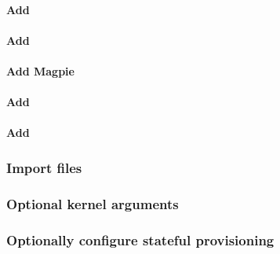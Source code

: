 \documentclass[letterpaper]{article}
\begin{document}
\paragraph{Add \clustershell{}}


\paragraph{Add \genders{}}


\paragraph{Add Magpie}


\paragraph{Add \conman{}} \label{sec:add_conman}


\paragraph{Add \nhc{}} \label{sec:add_nhc}



\subsubsection{Import files} \label{sec:file_import}








\subsubsection{Optional kernel arguments} \label{sec:optional_kargs}




\vspace*{-0.1cm}
\subsubsection{Optionally configure stateful provisioning}

\end{document}
